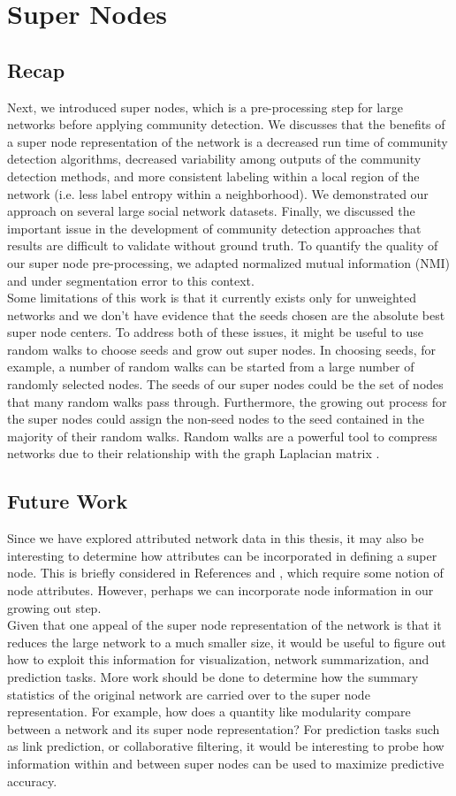 \section{Super Nodes}
\subsection{Recap}
Next, we introduced super nodes, which is a pre-processing step for large networks before applying community detection. We discusses that the benefits of a super node representation of the network is a decreased run time of community detection algorithms, decreased variability among outputs of the community detection methods, and more consistent labeling within a local region of the network (i.e. less label entropy within a neighborhood). We demonstrated our approach on several large social network datasets. Finally, we discussed the important issue in the development of community detection approaches that results are difficult to validate without ground truth. To quantify the quality of our super node pre-processing, we adapted normalized mutual information (NMI) and under segmentation error to this context. \\
\indent Some limitations of this work is that it currently exists only for unweighted networks and we don't have evidence that the seeds chosen are the absolute best super node centers. To address both of these issues, it might be useful to use random walks to choose seeds and grow out super nodes. In choosing seeds, for example, a number of random walks can be started from a large number of randomly selected nodes. The seeds of our super nodes could be the set of nodes that many random walks pass through. Furthermore, the growing out process for the super nodes could assign the non-seed nodes to the seed contained in the majority of their random walks. Random walks are a powerful tool to compress networks due to their relationship with the graph Laplacian matrix \cite{spectralWalk,laplacian}. 
\subsection{Future Work}
\indent Since we have explored attributed network data in this thesis, it may also be interesting to determine how attributes can be incorporated in defining a super node. This is briefly considered in References \cite{SuperNodeSide} and \cite{supergenomic}, which require some notion of node attributes. However, perhaps we can incorporate node information in our growing out step.\\
\indent Given that one appeal of the super node representation of the network is that it reduces the large network to a much smaller size, it would be useful to figure out how to exploit this information for visualization, network summarization, and prediction tasks. More work should be done to determine how the summary statistics of the original network are carried over to the super node representation. For example, how does a quantity like modularity compare between a network and its super node representation? For prediction tasks such as link prediction, or collaborative filtering, it would be interesting to probe how information within and between super nodes can be used to maximize predictive accuracy. 

